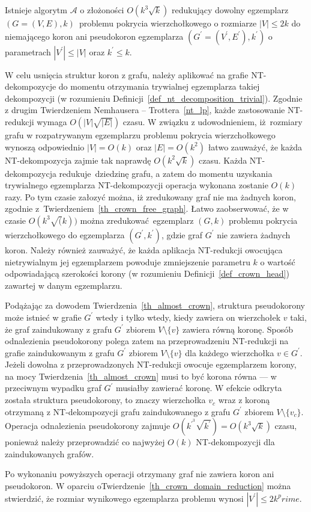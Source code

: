 {  \begin{theorem}
    Istnieje algorytm $\mathcal{A}$ o złożoności $O(k^3\sqrt{k})$ redukujący dowolny egzemplarz $(G=(V, E), k)$ problemu pokrycia wierzchołkowego o rozmiarze $|V|\leq 2k$ do niemającego koron ani pseudokoron egzemplarza $(G^\prime=(V^\prime, E^\prime), k^\prime)$ o parametrach $|V^\prime| \leq |V|$ oraz $k^\prime \leq k$.
  \end{theorem}
  \begin{bproof}
    W celu usnięcia struktur koron z grafu, należy aplikować na grafie NT-dekompozycje do momentu otrzymania trywialnej egzemplarza takiej dekompozycji (w rozumieniu Definicji~\ref{def_nt_decomposition_trivial}).
    Zgodnie z drugim Twierdzeniem Nemhausera -- Trottera~\ref{nt_lp}, każde zastosowanie NT-redukcji wymaga $O(|V|\sqrt{|E|})$ czasu.
    W związku z udowodnieniem, iż rozmiary grafu w rozpatrywanym egzemplarzu problemu pokrycia wierzchołkowego wynoszą odpowiednio $|V|=O(k)$ oraz $|E|=O(k^2)$ łatwo zauważyć, że każda NT-dekompozycja zajmie tak naprawdę $O(k^2\sqrt{k})$ czasu.
    Każda NT-dekompozycja redukuje dziedzinę grafu, a zatem do momentu uzyskania trywialnego egzemplarza NT-dekompozycji operacja wykonana zostanie $O(k)$ razy.
    Po tym czasie załozyć można, iż zredukowany graf nie ma żadnych koron, zgodnie z~Twierdzeniem~\ref{th_crown_free_graph}.
    Łatwo zaobserwować, że w czasie $O(k^3\sqrt(k))$ można zredukować egzemplarz $(G, k)$ problemu pokrycia wierzchołkowego do egzemplarza $(G^\prime, k^\prime)$, gdzie graf $G^\prime$ nie zawiera żadnych koron.
    Należy również zauważyć, że każda aplikacja NT-redukcji owocująca nietrywialnym jej egzemplarzem powoduje zmniejszenie parametru $k$ o wartość odpowiadającą szerokości korony (w rozumieniu Definicji~\ref{def_crown_head}) zawartej w danym egzemplarzu.

    Podążając za dowodem Twierdzenia~\ref{th_almost_crown}, struktura pseudokorony może istnieć w grafie $G^\prime$ wtedy i tylko wtedy, kiedy zawiera on wierzchołek $v$ taki, że graf zaindukowany z grafu $G^\prime$ zbiorem $V \setminus \{v\}$ zawiera równą koronę.
    Sposób odnalezienia pseudokorony polega zatem na przeprowadzeniu NT-redukcji na grafie zaindukowanym z grafu $G^\prime$ zbiorem $V \setminus \{v\}$ dla każdego wierzchołka $v \in G^\prime$.
    Jeżeli dowolna z przeprowadzonych NT-redukcji owocuje egzemplarzem korony, na mocy Twierdzenia~\ref{th_almost_crown} musi to być korona równa --- w przeciwnym wypadku graf $G^\prime$ musiałby zawierać koronę.
    W efekcie odkryta została struktura pseudokorony, to znaczy wierzchołka $v_c$ wraz z koroną otrzymaną z NT-dekompozycji grafu zaindukowanego z grafu $G^\prime$ zbiorem $V \setminus \{v_c\}$.
    Operacja odnalezienia pseudokorony zajmuje $O(k^{\prime}^3\sqrt{k^\prime})=O(k^3\sqrt{k})$ czasu, ponieważ należy przeprowadzić co najwyżej $O(k)$ NT-dekompozycji dla zaindukowanych grafów.

    Po wykonaniu powyższych operacji otrzymany graf nie zawiera koron ani pseudokoron.
    W oparciu  oTwierdzenie~\ref{th_crown_domain_reduction} można stwierdzić, że rozmiar wynikowego egzemplarza problemu wynosi $|V^\prime| \leq 2k^prime$.
  \end{bproof}
}

